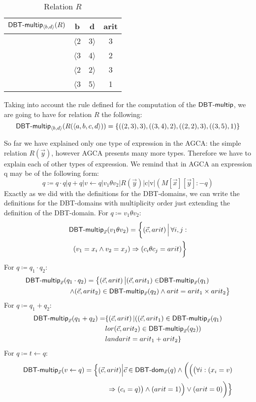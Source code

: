 \documentclass[12pt]{article}
\begin{document}
\begin{table}[H]
\centering
\begin{tabular}{c c c c}
	$\textsf{DBT-multip}{}_{\langle b,d\rangle}(R)$ & b & d & arit \\ [0.2ex]
	\hline
	  & $\langle $2 & 3$\rangle$ & 3\\
	  & $\langle $3 & 4$\rangle$ & 2\\
	  & $\langle $2 & 2$\rangle$ & 3\\
	  & $\langle $3 & 5$\rangle$ & 1\\
\end{tabular}
\caption{Relation $R$}
\end{table}

Taking into account the rule defined for the computation of the $\textsf{DBT-multip}{}$, we are going to have for relation $R$ the following:
$$\textsf{DBT-multip}{}_{\langle b,d\rangle}(R(\langle a,b,c,d\rangle))=\{((2,3),3),((3,4),2),((2,2),3),((3,5),1)\}$$

So far we have explained only one type of expression in the AGCA: the simple relation $R(\vec y)$, however AGCA presents many more types. Therefore we have to explain each of other types of expression. We remind that in AGCA an expression q may be of the following form:
\begin{equation}
q\coloneqq q\cdot q | q + q|v \gets q |v_{1}\theta v_{2}|R(\vec{y})|\text{c}|\text{v}|(M[\vec{x}][\vec{y}]:-q)
\end{equation}
Exactly as we did with the definitions for the DBT-domains, we can write the definitions for the DBT-domains with multiplicity order just extending the definition of the DBT-domain. For $q\coloneqq v_{1}\theta v_{2}$:
\begin{align}
\text{\textsf{DBT-multip}{}}_{\vec{x}}(v_{1}\theta v_{2})=\bigg\{(\vec{c},arit)\,\Big|\,\forall i,j:\nonumber\\(v_{1}=x_{i}\land v_{2}=x_{j})\Rightarrow (c_{i}\theta c_{j}=arit)\bigg\}
\end{align}
For $q\coloneqq q_{1}\cdot q_{2}$:
\begin{align} 
\text{\textsf{DBT-multip}}_{\vec{x}}(q_{1}\cdot q_{2})=\big\{(\vec{c},arit)\,\big|(\vec{c},arit_{1})\in&\text{\textsf{DBT-multip}}_{\vec{x}}(q_{1})\nonumber\\\land (\vec{c},arit_{2})\in\text{\textsf{DBT-multip}{}}_{\vec{x}}(q_{2})& \land arit= arit_{1}\times arit_{2}\big\}
\end{align}
For $q\coloneqq q_{1}+q_{2}$:
\begin{align}
\text{\textsf{DBT-multip}{}}_{\vec{x}}(q_{1}+ q_{2})=&\{(\vec{c},arit)\,|((\vec{c},arit_{1})\in\text{\textsf{DBT-multip}{}}_{\vec{x}}(q_{1})\nonumber\\&lor(\vec{c},arit_{2})\in\text{\textsf{DBT-multip}{}}_{\vec{x}}(q_{2}))\nonumber\\&land arit=arit_{1}+arit_{2}\}
\end{align}
For $q\coloneqq t\gets q$:
\begin{align}
\text{\textsf{DBT-multip}{}}_{\vec{x}}(v\gets q)=\Big\{(\vec{c},arit)\Big|\vec{c}\in\text{\textsf{DBT-dom}{}}_{\vec{x}}(q)\land \bigg(\Big(\big(\forall i: (x_{i}=v) & \nonumber\\\Rightarrow(c_{i}=q)\big)\land (arit=1)\Big)\lor (arit=0)\bigg)\Big\}
\end{align}
\end{document}
